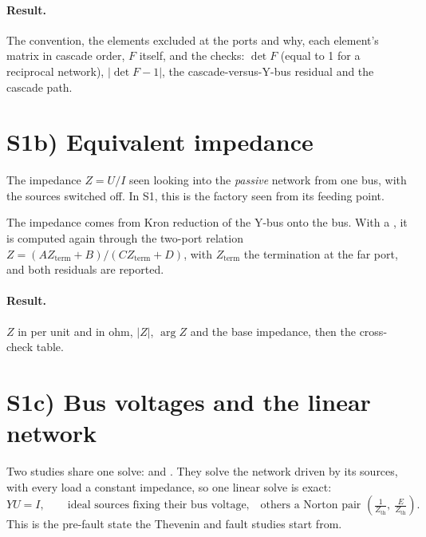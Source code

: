 \paragraph{Result.} The convention, the elements excluded at the ports and why, each
element's matrix in cascade order, $F$ itself, and the checks: $\det F$ (equal to 1 for a
reciprocal network), $|\det F - 1|$, the cascade-versus-Y-bus residual and the cascade
path.

\section{S1b) Equivalent impedance}

The impedance $Z = U/I$ seen looking into the \emph{passive} network from one bus, with
the sources switched off. In S1, this is the factory seen from its feeding point.



The impedance comes from Kron reduction of the Y-bus onto the bus. With a
, it is computed again through the two-port relation
$Z = (A Z_\text{term} + B)/(C Z_\text{term} + D)$, with $Z_\text{term}$ the termination at
the far port, and both residuals are reported.

\paragraph{Result.} $Z$ in per unit and in ohm, $|Z|$, $\arg Z$ and the base impedance,
then the cross-check table.

\section{S1c) Bus voltages and the linear network}\label{sec:study-linear}

Two studies share one solve:  and . They solve the network driven by its sources, with every load a constant
impedance, so one linear solve is exact:
\[
  Y U = I, \qquad
  \text{ideal sources fixing their bus voltage,}\quad
  \text{others a Norton pair } \left(\tfrac{1}{Z_\text{th}},\ \tfrac{E}{Z_\text{th}}\right).
\]
This is the pre-fault state the Thevenin and fault studies start from.



